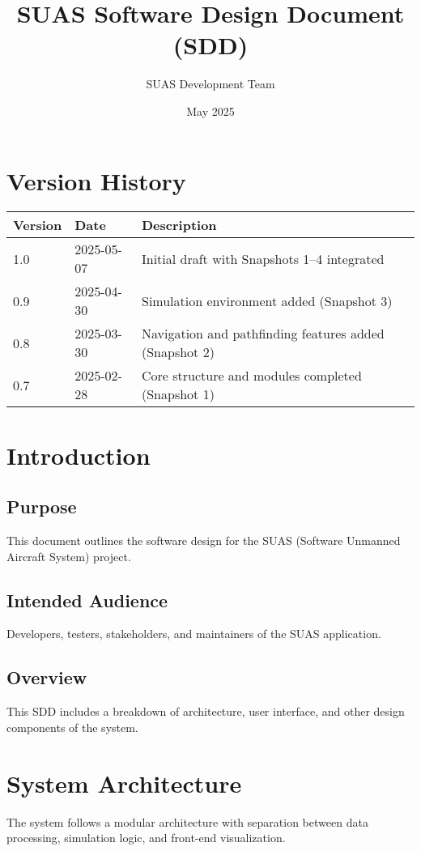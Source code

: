 \documentclass{article}
\title{SUAS Software Design Document (SDD)}
\author{SUAS Development Team}
\date{May 2025}
\begin{document}
\maketitle
\newpage

\tableofcontents
\newpage

\section*{Version History}
\begin{longtable}{| m{3cm} | m{3cm} | m{8cm} |}
\hline
\textbf{Version} & \textbf{Date} & \textbf{Description} \\
\hline
1.0 & 2025-05-07 & Initial draft with Snapshots 1–4 integrated \\
\hline
0.9 & 2025-04-30 & Simulation environment added (Snapshot 3) \\
\hline
0.8 & 2025-03-30 & Navigation and pathfinding features added (Snapshot 2) \\
\hline
0.7 & 2025-02-28 & Core structure and modules completed (Snapshot 1) \\
\hline
\end{longtable}

\section{Introduction}
\subsection{Purpose}
This document outlines the software design for the SUAS (Software Unmanned Aircraft System) project.

\subsection{Intended Audience}
Developers, testers, stakeholders, and maintainers of the SUAS application.

\subsection{Overview}
This SDD includes a breakdown of architecture, user interface, and other design components of the system.

\section{System Architecture}
The system follows a modular architecture with separation between data processing, simulation logic, and front-end visualization.
\end{document}
